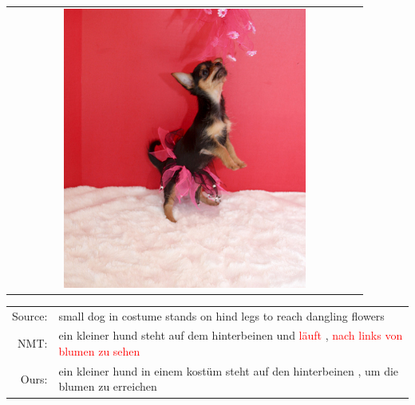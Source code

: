 \begin{table}[h]
\begin{subtable}{0.22\textwidth}
\centering
\begin{tabular}{c}
\includegraphics[width=0.7\textwidth]{chapters/IJCNLP/images/3720366614.jpg}
\end{tabular}
\end{subtable}%
\begin{subtable}{0.75\textwidth}
\begin{tabular}{rp{27em}}
Source: & small dog in costume stands on hind legs to reach dangling flowers \\
NMT: & ein kleiner hund steht auf dem hinterbeinen und \textcolor{red}{läuft} , \textcolor{red}{nach links von blumen zu sehen}  \\
Ours: & ein kleiner hund in einem kostüm steht auf den hinterbeinen , um die blumen zu erreichen\\
\end{tabular}

\end{subtable}

\vspace{0em}


\end{table}
